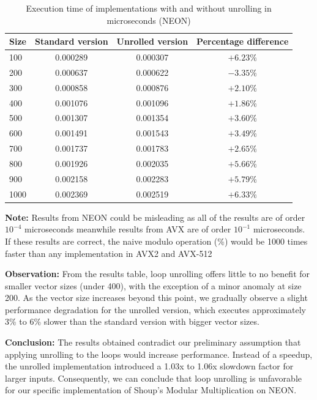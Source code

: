 \documentclass{article}
\newcommand{\pointlabel}[1]{\par\smallskip\noindent\textbf{\textcolor{accentorange}{#1:}} }
\begin{document}
\begin{table}[H]
    \centering
    \begin{tabular}{|l|c|c|c|}
        \hline
        Size & Standard version & Unrolled version & Percentage difference \\ \hline
        100  & 0.000289         & 0.000307         & $+6.23\%$             \\
        200  & 0.000637         & 0.000622         & $-3.35\%$             \\
        300  & 0.000858         & 0.000876         & $+2.10\%$             \\
        400  & 0.001076         & 0.001096         & $+1.86\%$             \\
        500  & 0.001307         & 0.001354         & $+3.60\%$             \\
        600  & 0.001491         & 0.001543         & $+3.49\%$             \\
        700  & 0.001737         & 0.001783         & $+2.65\%$             \\
        800  & 0.001926         & 0.002035         & $+5.66\%$             \\
        900  & 0.002158         & 0.002283         & $+5.79\%$             \\
        1000 & 0.002369         & 0.002519         & $+6.33\%$             \\
        \hline
    \end{tabular}
    \caption{Execution time of implementations with and without unrolling in microseconds (NEON)}
\end{table}

\pointlabel{Note} Results from NEON could be misleading as all of the results are of order $10^{-4}$ microseconds meanwhile results from AVX are of order $10^{-1}$ microseconds. If these results are correct, the naive modulo operation (\%) would be 1000 times faster than any implementation in AVX2 and AVX-512

\pointlabel{Observation}From the results table, loop unrolling offers little to no benefit for smaller vector sizes (under 400), with the exception of a minor anomaly at size 200. As the vector size increases beyond this point, we gradually observe a slight performance degradation for the unrolled version, which executes approximately 3\% to 6\% slower than the standard version with bigger vector sizes.
\pointlabel{Conclusion} The results obtained contradict our preliminary assumption that applying unrolling to the loops would increase performance. Instead of a speedup, the unrolled implementation introduced a 1.03x to 1.06x slowdown factor for larger inputs. Consequently, we can conclude that loop unrolling is unfavorable for our specific implementation of Shoup’s Modular Multiplication on NEON.
\end{document}
